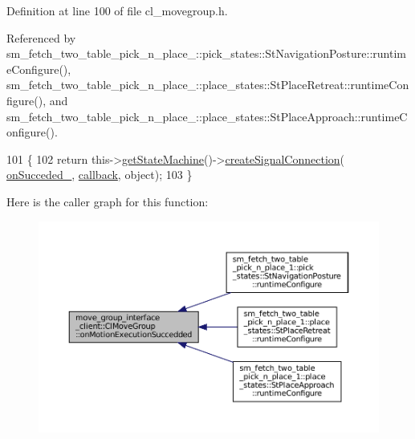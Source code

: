 Definition at line 100 of file cl\+\_\+movegroup.\+h.



Referenced by sm\+\_\+fetch\+\_\+two\+\_\+table\+\_\+pick\+\_\+n\+\_\+place\+\_\+::pick\+\_\+states\+::\+St\+Navigation\+Posture\+::runtime\+Configure(), sm\+\_\+fetch\+\_\+two\+\_\+table\+\_\+pick\+\_\+n\+\_\+place\+\_\+::place\+\_\+states\+::\+St\+Place\+Retreat\+::runtime\+Configure(), and sm\+\_\+fetch\+\_\+two\+\_\+table\+\_\+pick\+\_\+n\+\_\+place\+\_\+::place\+\_\+states\+::\+St\+Place\+Approach\+::runtime\+Configure().


\begin{DoxyCode}
101   \{
102     \textcolor{keywordflow}{return} this->\hyperlink{classsmacc_1_1ISmaccClient_aec51d4712404cb9882b86e4c854bb93a}{getStateMachine}()->\hyperlink{classsmacc_1_1ISmaccStateMachine_adf0f42ade0c65cc471960fe2a7c42da2}{createSignalConnection}(
      \hyperlink{classmove__group__interface__client_1_1ClMoveGroup_ac82aa6c44468e8035ff5df6d74746b88}{onSucceded\_}, \hyperlink{servers_2opencv__perception__node_2opencv__perception__node_8cpp_a050e697bd654facce10ea3f6549669b3}{callback}, \textcolor{keywordtype}{object});
103   \}
\end{DoxyCode}
Here is the caller graph for this function\+:
\nopagebreak
\begin{figure}[H]
\begin{center}
\leavevmode
\includegraphics[width=350pt]{classmove__group__interface__client_1_1ClMoveGroup_a04f3cafe060033b66f3fac27f744a043_icgraph}
\end{center}
\end{figure}
\mbox{\label{classmove__group__interface__client_1_1ClMoveGroup_a41c0eebdb446e6fbdd17113524c34869}} 
